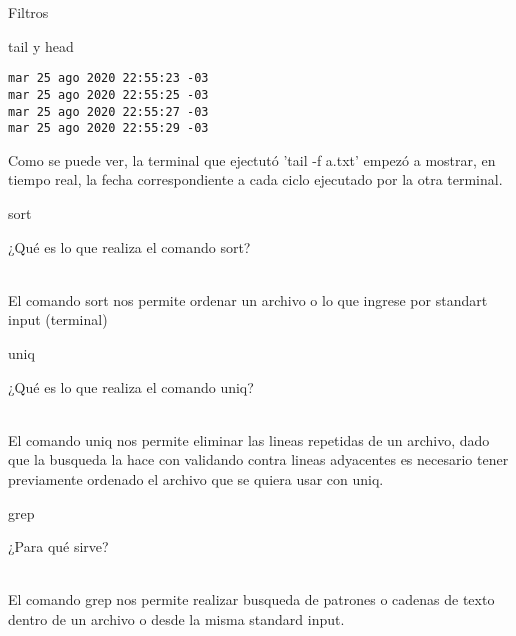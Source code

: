 \begin{section}{Filtros}
\begin{subsection}{tail y head}
\begin{lstlisting}[style=Ubuntu]
mar 25 ago 2020 22:55:23 -03
mar 25 ago 2020 22:55:25 -03
mar 25 ago 2020 22:55:27 -03
mar 25 ago 2020 22:55:29 -03

\end{lstlisting}
Como se puede ver, la terminal que ejectutó 'tail -f a.txt' empezó a mostrar, en tiempo real, la fecha correspondiente a cada ciclo ejecutado por la otra terminal.

\end{subsection}

\begin{subsection}{sort}
\begin{quoting}
¿Qué es lo que realiza el comando sort?
\end{quoting}\\
El comando sort nos permite ordenar un archivo o lo que ingrese por standart input (terminal)

\end{subsection}

\begin{subsection}{uniq}
\begin{quoting}
¿Qué es lo que realiza el comando uniq?
\end{quoting}\\
El comando uniq nos permite eliminar las lineas repetidas de un archivo, dado que la busqueda la hace con validando contra lineas adyacentes es necesario tener previamente ordenado el archivo que se quiera usar con uniq.

\end{subsection}

\begin{subsection}{grep}
\begin{quoting}
¿Para qué sirve?
\end{quoting}\\
El comando grep nos permite realizar busqueda de patrones o cadenas de texto dentro de un archivo o desde la misma standard input.


\end{subsection}
\end{section}
